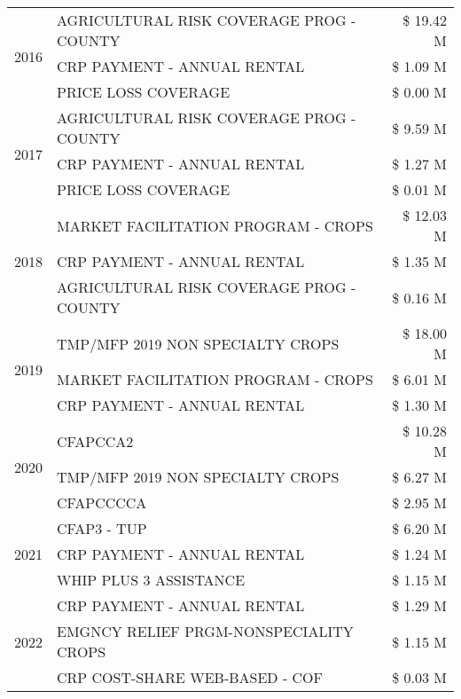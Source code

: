\begin{tabular}{llr}
\cline{1-3}
\multirow[t]{3}{*}{2016} & AGRICULTURAL RISK COVERAGE PROG - COUNTY & \$ 19.42 M \\
 & CRP PAYMENT - ANNUAL RENTAL & \$ 1.09 M \\
 & PRICE LOSS COVERAGE & \$ 0.00 M \\
\cline{1-3}
\multirow[t]{3}{*}{2017} & AGRICULTURAL RISK COVERAGE PROG - COUNTY & \$ 9.59 M \\
 & CRP PAYMENT - ANNUAL RENTAL & \$ 1.27 M \\
 & PRICE LOSS COVERAGE & \$ 0.01 M \\
\cline{1-3}
\multirow[t]{3}{*}{2018} & MARKET FACILITATION PROGRAM - CROPS & \$ 12.03 M \\
 & CRP PAYMENT - ANNUAL RENTAL & \$ 1.35 M \\
 & AGRICULTURAL RISK COVERAGE PROG - COUNTY & \$ 0.16 M \\
\cline{1-3}
\multirow[t]{3}{*}{2019} & TMP/MFP 2019 NON SPECIALTY CROPS & \$ 18.00 M \\
 & MARKET FACILITATION PROGRAM - CROPS & \$ 6.01 M \\
 & CRP PAYMENT - ANNUAL RENTAL & \$ 1.30 M \\
\cline{1-3}
\multirow[t]{3}{*}{2020} & CFAPCCA2 & \$ 10.28 M \\
 & TMP/MFP 2019 NON SPECIALTY CROPS & \$ 6.27 M \\
 & CFAPCCCCA & \$ 2.95 M \\
\cline{1-3}
\multirow[t]{3}{*}{2021} & CFAP3 - TUP & \$ 6.20 M \\
 & CRP PAYMENT - ANNUAL RENTAL & \$ 1.24 M \\
 & WHIP PLUS 3 ASSISTANCE & \$ 1.15 M \\
\cline{1-3}
\multirow[t]{3}{*}{2022} & CRP PAYMENT - ANNUAL RENTAL & \$ 1.29 M \\
 & EMGNCY RELIEF PRGM-NONSPECIALITY CROPS & \$ 1.15 M \\
 & CRP COST-SHARE WEB-BASED - COF & \$ 0.03 M \\
\cline{1-3}
\bottomrule
\end{tabular}
